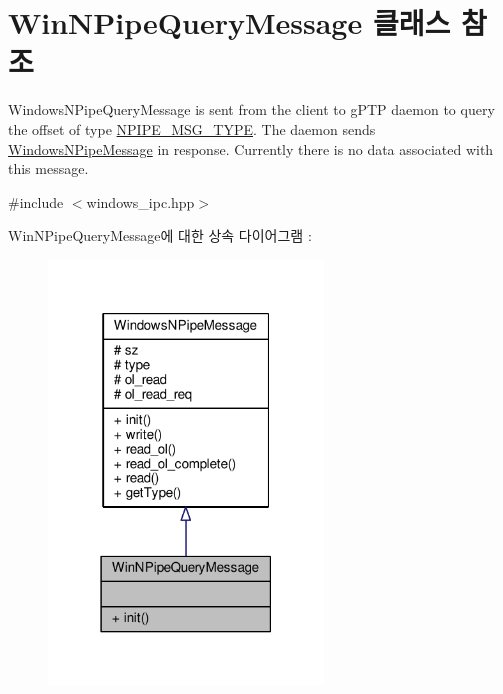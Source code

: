 \hypertarget{class_win_n_pipe_query_message}{}\section{Win\+N\+Pipe\+Query\+Message 클래스 참조}
\label{class_win_n_pipe_query_message}


Windows\+N\+Pipe\+Query\+Message is sent from the client to g\+P\+TP daemon to query the offset of type \hyperlink{windows__ipc_8hpp_a5a7d5ebd4af251aa73a4afcce1dc68a1}{N\+P\+I\+P\+E\+\_\+\+M\+S\+G\+\_\+\+T\+Y\+PE}. The daemon sends \hyperlink{class_windows_n_pipe_message}{Windows\+N\+Pipe\+Message} in response. Currently there is no data associated with this message.  




{\ttfamily \#include $<$windows\+\_\+ipc.\+hpp$>$}



Win\+N\+Pipe\+Query\+Message에 대한 상속 다이어그램 \+: 
\nopagebreak
\begin{figure}[H]
\begin{center}
\leavevmode
\includegraphics[width=207pt]{class_win_n_pipe_query_message__inherit__graph}
\end{center}
\end{figure}


